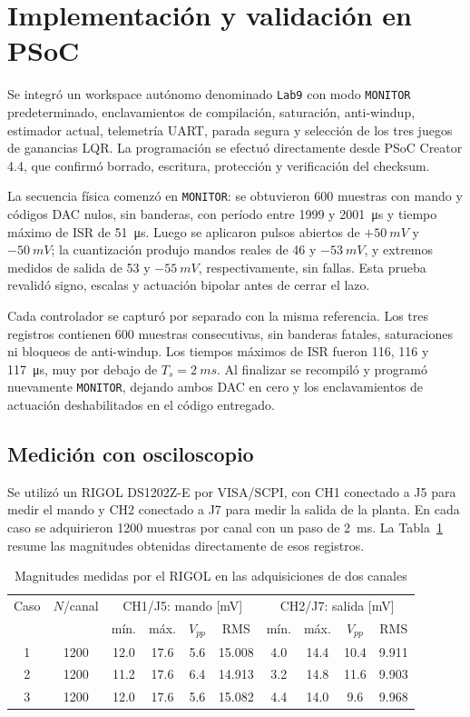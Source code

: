 \documentclass[conference]{IEEEtran}
\begin{document}
\section{Implementación y validación en PSoC}
Se integró un workspace autónomo denominado \texttt{Lab9} con modo \texttt{MONITOR} predeterminado, enclavamientos de compilación, saturación, anti-windup, estimador actual, telemetría UART, parada segura y selección de los tres juegos de ganancias LQR. La programación se efectuó directamente desde PSoC Creator 4.4, que confirmó borrado, escritura, protección y verificación del checksum.

La secuencia física comenzó en \texttt{MONITOR}: se obtuvieron 600 muestras con mando y códigos DAC nulos, sin banderas, con período entre 1999 y \SI{2001}{\micro s} y tiempo máximo de ISR de \SI{51}{\micro s}. Luego se aplicaron pulsos abiertos de $+\SI{50}{mV}$ y $-\SI{50}{mV}$; la cuantización produjo mandos reales de 46 y $-\SI{53}{mV}$, y extremos medidos de salida de 53 y $-\SI{55}{mV}$, respectivamente, sin fallas. Esta prueba revalidó signo, escalas y actuación bipolar antes de cerrar el lazo.

Cada controlador se capturó por separado con la misma referencia. Los tres registros contienen 600 muestras consecutivas, sin banderas fatales, saturaciones ni bloqueos de anti-windup. Los tiempos máximos de ISR fueron 116, 116 y \SI{117}{\micro s}, muy por debajo de $T_s=\SI{2}{ms}$. Al finalizar se recompiló y programó nuevamente \texttt{MONITOR}, dejando ambos DAC en cero y los enclavamientos de actuación deshabilitados en el código entregado.

\subsection{Medición con osciloscopio}
Se utilizó un RIGOL DS1202Z-E por VISA/SCPI, con CH1 conectado a J5 para medir el mando y CH2 conectado a J7 para medir la salida de la planta. En cada caso se adquirieron 1200 muestras por canal con un paso de \SI{2}{ms}. La Tabla~\ref{tab:rigol} resume las magnitudes obtenidas directamente de esos registros.

\begin{table}[!t]
\caption{Magnitudes medidas por el RIGOL en las adquisiciones de dos canales}
\label{tab:rigol}
\centering
\scriptsize
\begin{tabular}{cccccccccc}
\toprule
Caso & $N$/canal & \multicolumn{4}{c}{CH1/J5: mando [mV]} & \multicolumn{4}{c}{CH2/J7: salida [mV]}\\
 & & mín. & máx. & $V_{pp}$ & RMS & mín. & máx. & $V_{pp}$ & RMS\\
\midrule
1 & 1200 & 12.0 & 17.6 & 5.6 & 15.008 & 4.0 & 14.4 & 10.4 & 9.911\\
2 & 1200 & 11.2 & 17.6 & 6.4 & 14.913 & 3.2 & 14.8 & 11.6 & 9.903\\
3 & 1200 & 12.0 & 17.6 & 5.6 & 15.082 & 4.4 & 14.0 & 9.6 & 9.968\\
\bottomrule
\end{tabular}
\end{table}
\end{document}
